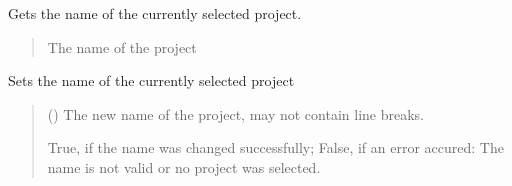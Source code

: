 \documentclass[letterpaper,10pt,english]{sphinxmanual}
\begin{document}
\begin{fulllineitems}
\begin{fulllineitems}
\begin{quote}
\begin{description}
\sphinxAtStartPar
{}

\end{description}\end{quote}

\end{fulllineitems}


\begin{fulllineitems}
\label{\detokenize{apidoc/src.osm_configurator.control:src.osm_configurator.control.control.Control.get_project_name}}
\pysigstartsignatures
{}
\pysigstopsignatures
\sphinxAtStartPar
Gets the name of the currently selected project.
\begin{quote}\begin{description}
\sphinxAtStartPar
The name of the project

\sphinxAtStartPar
{}

\end{description}\end{quote}

\end{fulllineitems}


\begin{fulllineitems}
\label{\detokenize{apidoc/src.osm_configurator.control:src.osm_configurator.control.control.Control.set_project_name}}
\pysigstartsignatures
{}
\pysigstopsignatures
\sphinxAtStartPar
Sets the name of the currently selected project
\begin{quote}\begin{description}
\sphinxAtStartPar
{} () \textendash{} The new name of the project, may not contain line breaks.

\sphinxAtStartPar
True, if the name was changed successfully; False, if an error accured: The name is not valid or no project was selected.


\end{description}
\end{quote}
\end{fulllineitems}
\end{fulllineitems}
\end{document}
